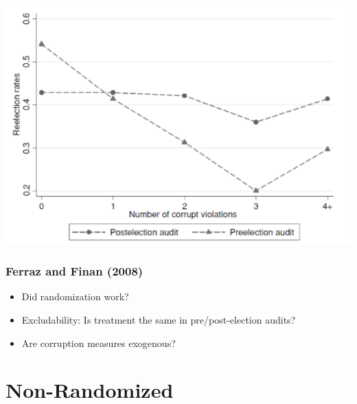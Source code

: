 \documentclass[xcolor=x11names,compress]{beamer}\usepackage[]{graphicx}\usepackage[]{color}
\renewcommand{\(}{\begin{columns}}
\renewcommand{\)}{\end{columns}}
\newcommand{\<}[1]{\begin{column}{#1}}
\renewcommand{\>}{\end{column}}
\begin{document}
\begin{frame}
\begin{center}
\includegraphics[scale=0.45]{Chart_FF.png}
\end{center}
\end{frame}

\begin{frame}
\frametitle{Ferraz and Finan (2008)}
\begin{itemize}
\item Did randomization work?
\item Excludability: Is treatment the same in pre/post-election audits?
\item Are corruption measures exogenous?
\end{itemize}
\end{frame}

\section{Non-Randomized}
\end{document}
